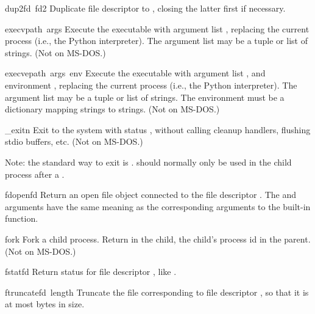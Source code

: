 \begin{funcdesc}{dup2}{fd\, fd2}
Duplicate file descriptor  to , closing the latter
first if necessary.
\end{funcdesc}

\begin{funcdesc}{execv}{path\, args}
Execute the executable  with argument list ,
replacing the current process (i.e., the Python interpreter).
The argument list may be a tuple or list of strings.
(Not on MS-DOS.)
\end{funcdesc}

\begin{funcdesc}{execve}{path\, args\, env}
Execute the executable  with argument list ,
and environment ,
replacing the current process (i.e., the Python interpreter).
The argument list may be a tuple or list of strings.
The environment must be a dictionary mapping strings to strings.
(Not on MS-DOS.)
\end{funcdesc}

\begin{funcdesc}{_exit}{n}
Exit to the system with status , without calling cleanup
handlers, flushing stdio buffers, etc.
(Not on MS-DOS.)

Note: the standard way to exit is .
 should normally only be used in the child process
after a .
\end{funcdesc}

\begin{funcdesc}{fdopen}{fd}
Return an open file object connected to the file descriptor .
The  and  arguments have the same meaning as
the corresponding arguments to the built-in  function.
\end{funcdesc}

\begin{funcdesc}{fork}{}
Fork a child process.  Return  in the child, the child's
process id in the parent.
(Not on MS-DOS.)
\end{funcdesc}

\begin{funcdesc}{fstat}{fd}
Return status for file descriptor , like .
\end{funcdesc}

\begin{funcdesc}{ftruncate}{fd\, length}
Truncate the file corresponding to file descriptor , 
so that it is at most  bytes in size.
\end{funcdesc}

